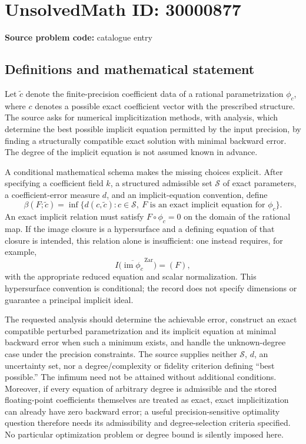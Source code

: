 \documentclass[11pt]{article}
\begin{document}
\section*{UnsolvedMath ID: 30000877}
\textbf{Source problem code:} catalogue entry
\subsection{Definitions and mathematical statement}
Let $\widetilde c$ denote the finite-precision coefficient data of a rational parametrization $\phi_c$, where $c$ denotes a possible exact coefficient vector with the prescribed structure. The source asks for numerical implicitization methods, with analysis, which determine the best possible implicit equation permitted by the input precision, by finding a structurally compatible exact solution with minimal backward error. The degree of the implicit equation is not assumed known in advance.

A conditional mathematical schema makes the missing choices explicit. After specifying a coefficient field $k$, a structured admissible set $\mathcal S$ of exact parameters, a coefficient-error measure $d$, and an implicit-equation convention, define
\[
\beta(F;\widetilde c)
=\inf\{d(c,\widetilde c):c\in\mathcal S,\ F\text{ is an exact implicit equation for }\phi_c\}.
\]
An exact implicit relation must satisfy $F\circ\phi_c=0$ on the domain of the rational map. If the image closure is a hypersurface and a defining equation of that closure is intended, this relation alone is insufficient: one instead requires, for example,
\[
I\bigl(\overline{\operatorname{im}\phi_c}^{\,\mathrm{Zar}}\bigr)=(F),
\]
with the appropriate reduced equation and scalar normalization. This hypersurface convention is conditional; the record does not specify dimensions or guarantee a principal implicit ideal.

The requested analysis should determine the achievable error, construct an exact compatible perturbed parametrization and its implicit equation at minimal backward error when such a minimum exists, and handle the unknown-degree case under the precision constraints. The source supplies neither $\mathcal S$, $d$, an uncertainty set, nor a degree/complexity or fidelity criterion defining ``best possible.'' The infimum need not be attained without additional conditions. Moreover, if every equation of arbitrary degree is admissible and the stored floating-point coefficients themselves are treated as exact, exact implicitization can already have zero backward error; a useful precision-sensitive optimality question therefore needs its admissibility and degree-selection criteria specified. No particular optimization problem or degree bound is silently imposed here.
\end{document}
